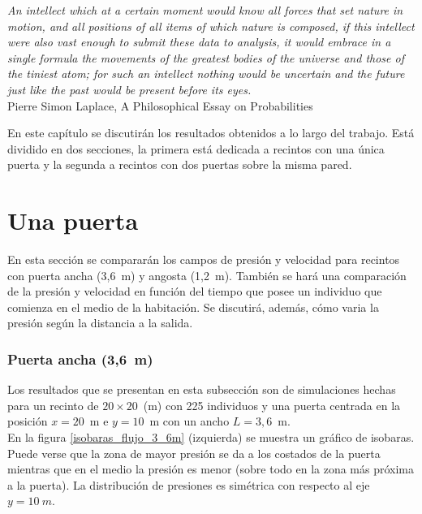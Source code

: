 \begin{flushleft}
 {\footnotesize{ \textsl {An intellect which at a certain moment would know all forces that set nature in motion, and all positions of all items of which nature is composed, if this intellect were also vast enough to submit these data to analysis, it would embrace in a single formula the movements of the greatest bodies of the universe and those of the tiniest atom; for such an intellect nothing would be uncertain and the future just like the past would be present before its eyes.}}} \\
\footnotesize  Pierre Simon Laplace, A Philosophical Essay on Probabilities\\
\end{flushleft}

En este capítulo se discutirán los resultados obtenidos a lo largo del trabajo. Está dividido en dos secciones, la primera está dedicada a recintos con una única puerta y la segunda a recintos con dos puertas sobre la misma pared.  

\section{Una puerta}

En esta sección se compararán los campos de presión y velocidad para recintos con puerta ancha (3,6~m) y angosta (1,2~m). También se hará una comparación de la presión y velocidad en función del tiempo que posee un individuo que comienza en el medio de la habitación. Se discutirá, además, cómo varia la presión según la distancia a la salida.     

\subsubsection{Puerta ancha (3,6~m)}

Los resultados que se presentan en esta subsección son de simulaciones hechas para un recinto de  $20\times 20$~(m) con 225 individuos y una puerta centrada en la posición $x=20$~m e $y=10$~m con un ancho $L=3,6$~m.\\
En la figura \ref{isobaras_flujo_3_6m} (izquierda) se muestra un gráfico de isobaras. Puede verse que la zona de mayor presión se da a los costados de la puerta mientras que en el medio la presión es menor (sobre todo en la zona más próxima a la puerta). La distribución de presiones es simétrica con respecto al eje $y=10~m$. 

